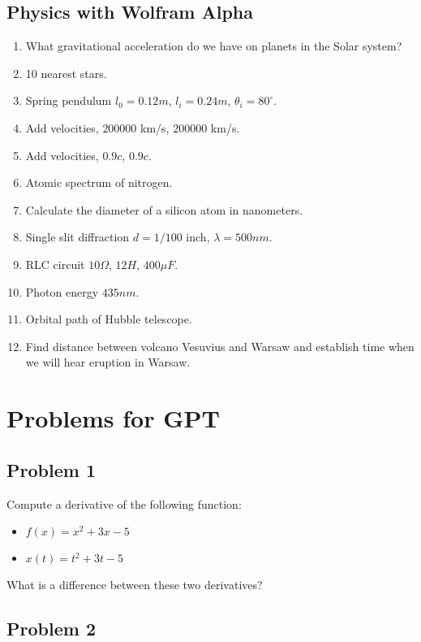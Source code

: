 \documentclass[11pt]{article}
\begin{document}
\subsection*{Physics with Wolfram Alpha}
\begin{enumerate}
    \item What gravitational acceleration do we have on planets in the Solar system?
    \item 10 nearest stars.
    \item Spring pendulum $l_0=0.12m$, $l_i=0.24m$, $\theta_i=80^\circ$.
    \item Add velocities, $200000$ km/s, $200000$ km/s.
    \item Add velocities, $0.9c$, $0.9c$.
    \item Atomic spectrum of nitrogen.
    \item Calculate the diameter of a silicon atom in nanometers.
    \item Single slit diffraction $d=1/100$ inch, $\lambda=500nm$.
    \item RLC circuit $10\Omega$, $12H$, $400\mu F$.
    \item Photon energy $435nm$.
    \item Orbital path of Hubble telescope.
    \item Find distance between volcano Vesuvius and Warsaw and establish time when we will hear eruption in Warsaw.
\end{enumerate}

\newpage

\section*{Problems for GPT}

\subsection*{Problem 1}

Compute a derivative of the following function:

\begin{itemize}
    \item $f(x) = x^2 + 3x - 5$
    \item $x(t) = t^2 + 3t - 5$
\end{itemize}

What is a difference between these two derivatives?

\subsection*{Problem 2}
\end{document}
